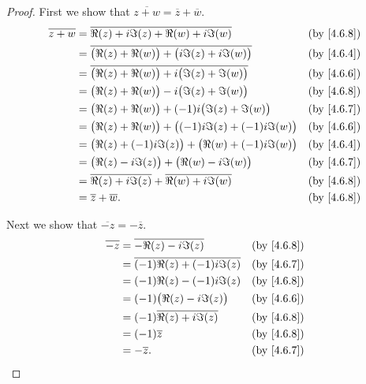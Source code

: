 \begin{proof}
  First we show that \(\overline{z + w} = \overline{z} + \overline{w}\).
  \begin{align*}
    \overline{z + w} & = \overline{\Re(z) + i \Im(z) + \Re(w) + i \Im(w)}                     &  & \by{4.6.8} \\
                     & = \overline{\big(\Re(z) + \Re(w)\big) + \big(i \Im(z) + i \Im(w)\big)} &  & \by{4.6.4} \\
                     & = \overline{\big(\Re(z) + \Re(w)\big) + i \big(\Im(z) + \Im(w)\big)}   &  & \by{4.6.6} \\
                     & = \big(\Re(z) + \Re(w)\big) - i \big(\Im(z) + \Im(w)\big)              &  & \by{4.6.8} \\
                     & = \big(\Re(z) + \Re(w)\big) + (-1) i \big(\Im(z) + \Im(w)\big)         &  & \by{4.6.7} \\
                     & = \big(\Re(z) + \Re(w)\big) + \big((-1) i \Im(z) + (-1) i \Im(w)\big)  &  & \by{4.6.6} \\
                     & = \big(\Re(z) + (-1) i \Im(z)\big) + \big(\Re(w) + (-1) i \Im(w)\big)  &  & \by{4.6.4} \\
                     & = \big(\Re(z) - i \Im(z)\big) + \big(\Re(w) - i \Im(w)\big)            &  & \by{4.6.7} \\
                     & = \overline{\Re(z) + i \Im(z)} + \overline{\Re(w) + i \Im(w)}          &  & \by{4.6.8} \\
                     & = \overline{z} + \overline{w}.                                         &  & \by{4.6.8}
  \end{align*}

  Next we show that \(\overline{-z} = -\overline{z}\).
  \begin{align*}
    \overline{-z} & = \overline{-\Re(z) - i \Im(z)}          &  & \by{4.6.8} \\
                  & = \overline{(-1) \Re(z) + (-1) i \Im(z)} &  & \by{4.6.7} \\
                  & = (-1) \Re(z) - (-1) i \Im(z)            &  & \by{4.6.8} \\
                  & = (-1) \big(\Re(z) - i \Im(z)\big)       &  & \by{4.6.6} \\
                  & = (-1) \overline{\Re(z) + i \Im(z)}      &  & \by{4.6.8} \\
                  & = (-1) \overline{z}                      &  & \by{4.6.8} \\
                  & = -\overline{z}.                         &  & \by{4.6.7}
  \end{align*}


\end{proof}
